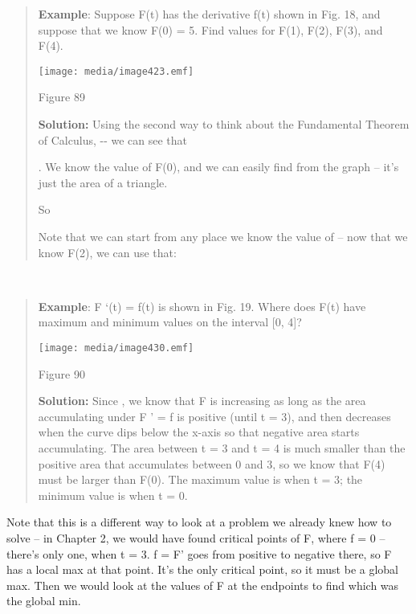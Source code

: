 \begin{quote}
\textbf{Example}: Suppose F(t) has the derivative f(t) shown in Fig. 18,
and suppose that we know F(0) = 5. Find values for F(1), F(2), F(3), and
F(4).

\texttt{[image: media/image423.emf]}

Figure 89

\textbf{Solution:} Using the second way to think about the Fundamental
Theorem of Calculus, -\/- we can see that

. We know the value of F(0), and we can easily find from the graph --
it's just the area of a triangle.

So

Note that we can start from any place we know the value of -- now that
we know F(2), we can use that:
\end{quote}

\textbf{\\
}

\begin{quote}
\textbf{Example}: F `(t) = f(t) is shown in Fig. 19. Where does F(t)
have maximum and minimum values on the interval {[}0, 4{]}?

\texttt{[image: media/image430.emf]}

Figure 90

\textbf{Solution:} Since , we know that F is increasing as long as the
area accumulating under F ' = f is positive (until t = 3), and then
decreases when the curve dips below the x-axis so that negative area
starts accumulating. The area between t = 3 and t = 4 is much smaller
than the positive area that accumulates between 0 and 3, so we know that
F(4) must be larger than F(0). The maximum value is when t = 3; the
minimum value is when t = 0.
\end{quote}

Note that this is a different way to look at a problem we already knew
how to solve -- in Chapter 2, we would have found critical points of F,
where f = 0 -- there's only one, when t = 3. f = F' goes from positive
to negative there, so F has a local max at that point. It's the only
critical point, so it must be a global max. Then we would look at the
values of F at the endpoints to find which was the global min.

\subsection{}\label{section-7}


